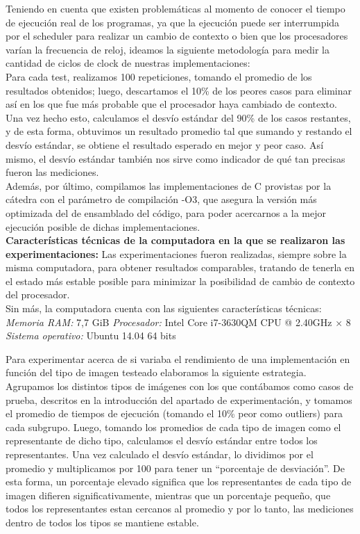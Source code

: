 Teniendo en cuenta que existen problemáticas al momento de conocer el tiempo de ejecución real de los programas, ya que la ejecución puede ser interrumpida por el scheduler para realizar un cambio de contexto o bien que los procesadores varían la frecuencia de reloj, ideamos la siguiente metodología para medir la cantidad de ciclos de clock de nuestras implementaciones:\\
Para cada test, realizamos 100 repeticiones, tomando el promedio de los resultados obtenidos; luego, descartamos el 10\% de los peores casos para eliminar así en los que fue más probable que el procesador haya cambiado de contexto. Una vez hecho esto, calculamos el desvío estándar del 90\% de los casos restantes, y de esta forma, obtuvimos un resultado promedio tal que sumando y restando el desvío estándar, se obtiene el resultado esperado en mejor y peor caso. Así mismo, el desvío estándar también nos sirve como indicador de qué tan precisas fueron las mediciones.\\
Además, por último, compilamos las implementaciones de C provistas por la cátedra con el parámetro de compilación -O3, que asegura la versión más optimizada del de ensamblado del código, para poder acercarnos a la mejor ejecución posible de dichas implementaciones.\\

\textbf{Características técnicas de la computadora en la que se realizaron las experimentaciones:}
Las experimentaciones fueron realizadas, siempre sobre la misma computadora, para obtener resultados comparables, tratando de tenerla en el estado más estable posible para minimizar la posibilidad de cambio de contexto del procesador.\\
Sin más, la computadora cuenta con las siguientes características técnicas:\\

\textit{Memoria RAM:} 7,7 GiB
\textit{Procesador:} Intel Core i7-3630QM CPU @ 2.40GHz × 8
\textit{Sistema operativo:} Ubuntu 14.04 64 bits

Para experimentar acerca de si variaba el rendimiento de una implementación en función del tipo de imagen testeado elaboramos la siguiente estrategia. Agrupamos los distintos tipos de imágenes con los que contábamos como casos de prueba, descritos en la introducción del apartado de experimentación, y tomamos el promedio de tiempos de ejecución (tomando el 10\% peor como outliers) para cada subgrupo. Luego, tomando los promedios de cada tipo de imagen como el representante de dicho tipo, calculamos el desvío estándar entre todos los representantes. Una vez calculado el desvío estándar, lo dividimos por el promedio y multiplicamos por 100 para tener un “porcentaje de desviación”. De esta forma, un porcentaje elevado significa que los representantes de cada tipo de imagen difieren significativamente, mientras que un porcentaje pequeño, que todos los representantes estan cercanos al promedio y por lo tanto, las mediciones dentro de todos los tipos se mantiene estable.\\

